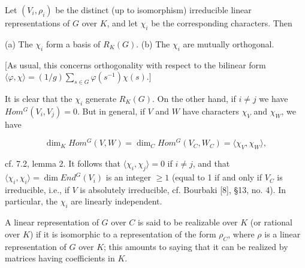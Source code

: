 Let $(V_i, \rho_i)$ be the distinct (up to isomorphism) irreducible linear representations of $G$ over $K$, and let $\chi_i$ be the corresponding characters. Then

(a) The $\chi_i$ form a basis of $R_K(G)$.
(b) The $\chi_i$ are mutually orthogonal.

[As usual, this concerns orthogonality with respect to the bilinear form $\langle \varphi, \chi \rangle = (1/g) \sum_{s \in G} \varphi(s^{-1})\chi(s).$]

It is clear that the $\chi_i$ generate $R_K(G)$. On the other hand, if $i \neq j$ we have $Hom^G(V_i, V_j) = 0$. But in general, if $V$ and $W$ have characters $\chi_V$ and $\chi_W$, we have

$$\dim_K Hom^G(V, W) = \dim_C Hom^G(V_C, W_C) = \langle \chi_V, \chi_W \rangle,$$

cf. 7.2, lemma 2. It follows that $\langle \chi_i, \chi_j \rangle = 0$ if $i \neq j$, and that $\langle \chi_i, \chi_i \rangle = \dim End^G(V_i)$ is an integer $\geqslant 1$ (equal to 1 if and only if $V_C$ is irreducible, i.e., if $V$ is absolutely irreducible, cf. Bourbaki [8], §13, no. 4). In particular, the $\chi_i$ are linearly independent.

A linear representation of $G$ over $C$ is said to be realizable over $K$ (or rational over $K$) if it is isomorphic to a representation of the form $\rho_C$, where $\rho$ is a linear representation of $G$ over $K$; this amounts to saying that it can be realized by matrices having coefficients in $K$.
